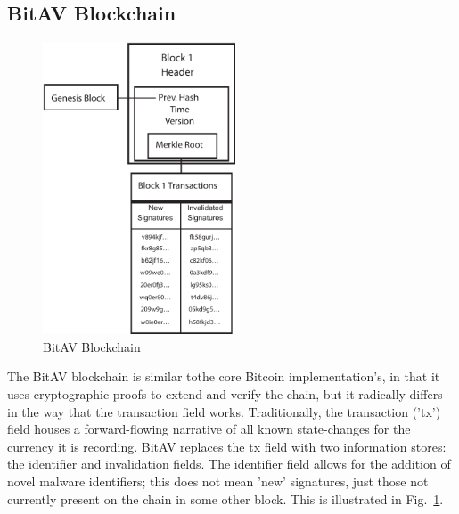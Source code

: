 \documentclass[12pt,journal]{IEEEtran}
\begin{document}
\subsection{BitAV Blockchain}
\begin{figure}[!t]
\centering
\includegraphics[width=2.25in]{figures/vector/bitAVChain}
\caption{BitAV Blockchain}
\label{fig_bitChain}
\end{figure}

The BitAV blockchain is similar tothe core Bitcoin implementation's, in that it uses cryptographic proofs to extend and verify the chain, but it radically differs in the way that the transaction field works. Traditionally, the transaction ('tx') field houses a forward-flowing narrative of all known state-changes for the currency it is recording\cite{Buterin2014}. BitAV replaces the tx field with two information stores: the identifier and invalidation fields. The identifier field allows for the addition of novel malware identifiers; this does not mean 'new' signatures, just those not currently present on the chain in some other block. This is illustrated in Fig.~\ref{fig_bitChain}.\par
\end{document}
